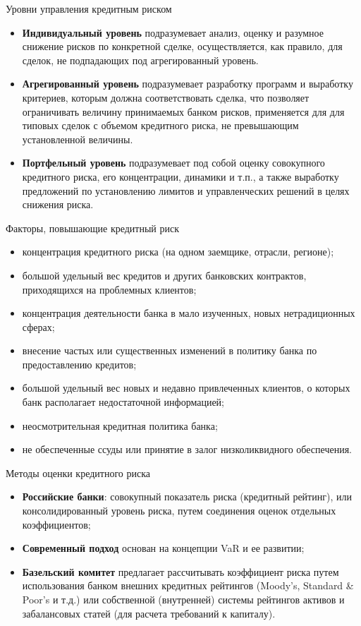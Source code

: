 \documentclass[financial_risks_lectures.tex]{subfiles}
\begin{document}
\begin{frame}[shrink=10]{Уровни управления кредитным риском}
\begin{itemize}[<+->]
\item
\textbf{Индивидуальный уровень }подразумевает анализ, оценку и разумное снижение рисков по конкретной сделке, осуществляется, как правило, для сделок, не подпадающих под агрегированный уровень.
\item
\textbf{Агрегированный уровень }подразумевает разработку программ и выработку критериев, которым должна соответствовать сделка, что позволяет ограничивать величину принимаемых банком рисков, применяется для для типовых сделок с объемом кредитного риска, не превышающим установленной величины.
\item
\textbf{Портфельный уровень} подразумевает под собой оценку совокупного кредитного риска, его концентрации, динамики и т.п., а также выработку предложений по установлению лимитов и управленческих решений в целях снижения риска.
\end{itemize}
\end{frame}

\begin{frame}[shrink=10]{Факторы, повышающие кредитный риск}
\begin{itemize}[<+->]
\item
концентрация кредитного риска (на одном заемщике, отрасли, регионе);
\item
большой удельный вес кредитов и других банковских контрактов, приходящихся на проблемных клиентов;
\item
концентрация деятельности банка в мало изученных, новых нетрадиционных сферах;
\item
внесение частых или существенных изменений в политику банка по предоставлению кредитов;
\item
большой удельный вес новых и недавно привлеченных клиентов, о которых банк располагает недостаточной информацией;
\item
неосмотрительная кредитная политика банка;
\item
не обеспеченные ссуды или принятие в залог низколиквидного обеспечения.
\end{itemize}
\end{frame}

\begin{frame}{Методы оценки кредитного риска}
\begin{itemize}[<+->]
\item
\textbf{Российские банки}: совокупный показатель риска (кредитный рейтинг), или консолидированный уровень риска, путем соединения оценок отдельных коэффициентов;
\item
\textbf{Современный подход }основан на концепции VaR и ее развитии;
\item
\textbf{Базельский комитет }предлагает рассчитывать коэффициент риска путем использования банком внешних кредитных рейтингов (Moody's, Standard \& Poor's и т.д.) или собственной (внутренней) системы рейтингов активов и забалансовых статей (для расчета требований к капиталу).
\end{itemize}
\end{frame}
\end{document}
